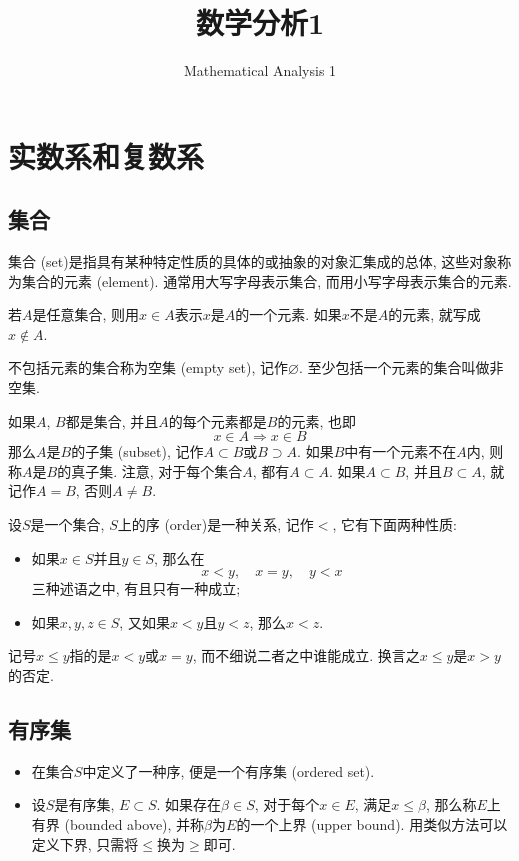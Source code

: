 \documentclass[cn,12pt,math=mtpro2,citestyle=gb7714-2015,bibstyle=gb7714-2015,twocol]{elegantbook}
\title{数学分析1}
\subtitle{Mathematical Analysis 1}
\let\emptyset\varnothing
\begin{document}
\maketitle
\frontmatter

\tableofcontents

\mainmatter

\chapter{实数系和复数系}
\section{集合}
\begin{definition}
集合 (set)是指具有某种特定性质的具体的或抽象的对象汇集成的总体, 这些对象称为集合的元素 (element). 通常用大写字母表示集合, 而用小写字母表示集合的元素.
\end{definition}

若$A$是任意集合, 则用$x\in A$表示$x$是$A$的一个元素. 如果$x$不是$A$的元素, 就写成$x \notin A$.

不包括元素的集合称为空集 (empty set), 记作$\emptyset$. 至少包括一个元素的集合叫做非空集.

如果$A$, $B$都是集合, 并且$A$的每个元素都是$B$的元素, 也即
$$x\in A\Rightarrow x\in B$$
那么$A$是$B$的子集 (subset), 记作$A \subset B$或$B \supset A$. 如果$B$中有一个元素不在$A$内, 则称$A$是$B$的真子集. 注意, 对于每个集合$A$, 都有$A\subset A$. 如果$A\subset B$, 并且$B\subset A$, 就记作$A=B$, 否则$A\neq B$.


\begin{definition}
设$S$是一个集合, $S$上的序 (order)是一种关系, 记作$<$, 它有下面两种性质:
\begin{itemize}
\item 如果$x \in S$并且$y\in S$, 那么在
$$x<y,\quad x=y, \quad y<x$$
三种述语之中, 有且只有一种成立;

\item 如果$x, y, z \in S$, 又如果$x<y$且$y<z$, 那么$x<z$.
\end{itemize}
\end{definition}

记号$x\leq y$指的是$x<y$或$x=y$, 而不细说二者之中谁能成立. 换言之$x\leq y$是$x>y$的否定.
\section{有序集}
\begin{definition}
\begin{itemize}
\item 在集合$S$中定义了一种序, 便是一个有序集 (ordered set).

\item 设$S$是有序集, $E\subset S$. 如果存在$\beta \in S$, 对于每个$x \in E$, 满足$x\leq \beta$, 那么称$E$上有界 (bounded above), 并称$\beta$为$E$的一个上界 (upper bound). 用类似方法可以定义下界, 只需将$\leq$换为$\geq$即可.
\end{itemize}
\end{definition}
\end{document}
